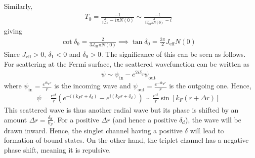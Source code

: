 Similarly,
\begin{equation}\begin{aligned}
T_0 =  \frac{-1}{\frac{2}{3 J_\text{eff}} - i\pi N(0)} \sim \frac{-1}{\frac{2}{3 J_\text{eff} \pi N(0)} - i}
\end{aligned}\end{equation}
giving
\begin{equation}\begin{aligned}
\cot \delta_0 = \frac{2}{3 J_\text{eff} \pi N(0)} \implies \tan \delta_0 = \frac{3\pi}{2} J_\text{eff} N(0)
\end{aligned}\end{equation}
Since \(J_\text{eff} > 0\), \(\delta_1 < 0\) and \(\delta_0 > 0\).
The significance of this can be seen as follows.
For scattering at the Fermi surface, the scattered wavefunction can be written as
\begin{equation}\begin{aligned}
\psi \sim \psi_\text{in} - e^{2 i \delta_d} \psi_\text{out}
\end{aligned}\end{equation}
where \(\psi_\text{in} = \frac{e^{ik_F r}}{r}\) is the incoming wave and \(\psi_\text{out} = \frac{e^{-ik_F r}}{r}\) is the outgoing one.
Hence,
\begin{equation}\begin{aligned}
	\psi = \frac{e^{i \delta}}{r} \left(e^{-i\left(k_Fr + \delta_d\right)} - e^{i\left(k_Fr + \delta_d\right)}\right) \sim \frac{e^{i \delta}}{r} \sin \left[k_F\left(r + \Delta r\right)\right]
\end{aligned}\end{equation}
This scattered wave is thus another radial wave but its phase is shifted by an amount \(\Delta r = \frac{\delta_d}{k_F}\).
For a positive \(\Delta r\) (and hence a positive \(\delta_d\)), the wave will be drawn inward.
Hence, the singlet channel having a positive \(\delta\) will lead to formation of bound states.
On the  other hand, the triplet channel has a negative phase shift, meaning it is repulsive.

